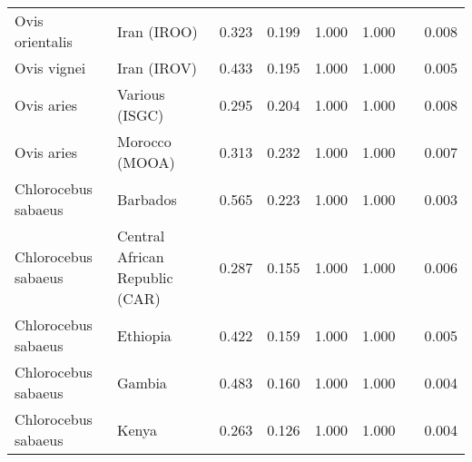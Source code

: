 \begin{center}
\begin{adjustbox}{width = 1\textwidth}
\begin{tabular}{|l|l|r|r|r|r|r|}
     Ovis orientalis &                     Iran (IROO) &                                              0.323 &                                              0.199 &                1.000 &                                  1.000~~ &              0.008 \\
         Ovis vignei &                     Iran (IROV) &                                              0.433 &                                              0.195 &                1.000 &                                  1.000~~ &              0.005 \\
          Ovis aries &                  Various (ISGC) &                                              0.295 &                                              0.204 &                1.000 &                                  1.000~~ &              0.008 \\
          Ovis aries &                  Morocco (MOOA) &                                              0.313 &                                              0.232 &                1.000 &                                  1.000~~ &              0.007 \\
 Chlorocebus sabaeus &                        Barbados &                                              0.565 &                                              0.223 &                1.000 &                                  1.000~~ &              0.003 \\
 Chlorocebus sabaeus &  Central African Republic (CAR) &                                              0.287 &                                              0.155 &                1.000 &                                  1.000~~ &              0.006 \\
 Chlorocebus sabaeus &                        Ethiopia &                                              0.422 &                                              0.159 &                1.000 &                                  1.000~~ &              0.005 \\
 Chlorocebus sabaeus &                          Gambia &                                              0.483 &                                              0.160 &                1.000 &                                  1.000~~ &              0.004 \\
 Chlorocebus sabaeus &                           Kenya &                                              0.263 &                                              0.126 &                1.000 &                                  1.000~~ &              0.004 \\

\end{tabular}
\end{adjustbox}
\end{center}
